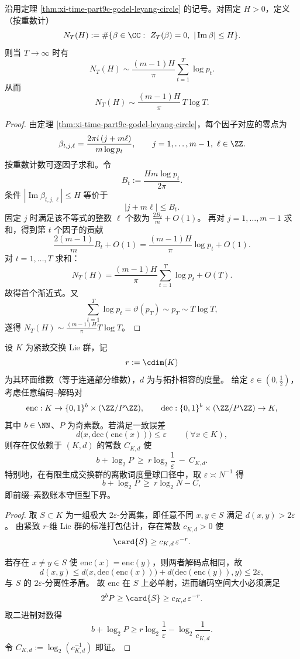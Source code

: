 \begin{theorem}\label{thm:xi-time-part9c-godel-leyang-zero-count}
沿用定理 \ref{thm:xi-time-part9c-godel-leyang-circle} 的记号。对固定 \(H>0\)，定义（按重数计）
\[
N_T(H):=\#\{\beta\in\CC:\ Z_T(\beta)=0,\ |\operatorname{Im}\beta|\le H\}.
\]
则当 \(T\to\infty\) 时有
\[
N_T(H)\sim \frac{(m-1)H}{\pi}\sum_{t=1}^{T}\log p_t.
\]
从而
\[
N_T(H)\sim \frac{(m-1)H}{\pi}\,T\log T.
\]
\end{theorem}
\begin{proof}
由定理 \ref{thm:xi-time-part9c-godel-leyang-circle}，每个因子对应的零点为
\[
\beta_{t,j,\ell}
=\frac{2\pi i\,(j+m\ell)}{m\log p_t},
\qquad
j=1,\dots,m-1,\ \ell\in\ZZ.
\]
按重数计数可逐因子求和。令
\[
B_t:=\frac{Hm\log p_t}{2\pi}.
\]
条件 \(|\operatorname{Im}\beta_{t,j,\ell}|\le H\) 等价于
\[
|j+m\ell|\le B_t.
\]
固定 \(j\) 时满足该不等式的整数 \(\ell\) 个数为
\(
\frac{2B_t}{m}+O(1)
\)。
再对 \(j=1,\dots,m-1\) 求和，得到第 \(t\) 个因子的贡献
\[
\frac{2(m-1)}{m}B_t+O(1)
=\frac{(m-1)H}{\pi}\log p_t+O(1).
\]
对 \(t=1,\dots,T\) 求和：
\[
N_T(H)
=\frac{(m-1)H}{\pi}\sum_{t=1}^{T}\log p_t+O(T).
\]
故得首个渐近式。又
\[
\sum_{t=1}^{T}\log p_t=\vartheta(p_T)\sim p_T\sim T\log T,
\]
遂得
\(
N_T(H)\sim \frac{(m-1)H}{\pi}T\log T
\)。
\end{proof}

\begin{theorem}[圆维--素数账本编码的一致误差信息下界]\label{thm:xi-time-part9c-cdim-prime-ledger-info-lb}
设 \(K\) 为紧致交换 Lie 群，记
\[
r:=\cdim(K)
\]
为其环面维数（等于连通部分维数），\(d\) 为与拓扑相容的度量。
给定 \(\varepsilon\in(0,\frac12)\)，考虑任意编码--解码对
\[
\mathrm{enc}:K\to\{0,1\}^b\times(\ZZ/P\ZZ),\qquad
\mathrm{dec}:\{0,1\}^b\times(\ZZ/P\ZZ)\to K,
\]
其中 \(b\in\NN\)、\(P\) 为奇素数。若满足一致误差
\[
d\bigl(x,\mathrm{dec}(\mathrm{enc}(x))\bigr)\le\varepsilon
\qquad(\forall x\in K),
\]
则存在仅依赖于 \((K,d)\) 的常数 \(C_{K,d}\) 使
\[
b+\log_2P\ \ge\ r\log_2\frac1\varepsilon\ -\ C_{K,d}.
\]
特别地，在有限生成交换群的离散词度量球口径中，取 \(\varepsilon\asymp N^{-1}\) 得
\[
b+\log_2P\ \ge\ r\log_2N-C,
\]
即前缀--素数账本守恒型下界。
\end{theorem}
\begin{proof}
取 \(S\subset K\) 为一组极大 \(2\varepsilon\)-分离集，即任意不同 \(x,y\in S\) 满足 \(d(x,y)>2\varepsilon\)。
由紧致 \(r\)-维 Lie 群的标准打包估计，存在常数 \(c_{K,d}>0\) 使
\[
\card{S}\ge c_{K,d}\,\varepsilon^{-r}.
\]

若存在 \(x\neq y\in S\) 使 \(\mathrm{enc}(x)=\mathrm{enc}(y)\)，则两者解码点相同，故
\[
d(x,y)
\le d\bigl(x,\mathrm{dec}(\mathrm{enc}(x))\bigr)
+d\bigl(\mathrm{dec}(\mathrm{enc}(y)),y\bigr)
\le 2\varepsilon,
\]
与 \(S\) 的 \(2\varepsilon\)-分离性矛盾。
故 \(\mathrm{enc}\) 在 \(S\) 上必单射，进而编码空间大小必须满足
\[
2^bP\ge \card{S}\ge c_{K,d}\,\varepsilon^{-r}.
\]
取二进制对数得
\[
b+\log_2P
\ge r\log_2\frac1\varepsilon-\log_2\frac1{c_{K,d}}.
\]
令 \(C_{K,d}:=\log_2(c_{K,d}^{-1})\) 即证。
\end{proof}

